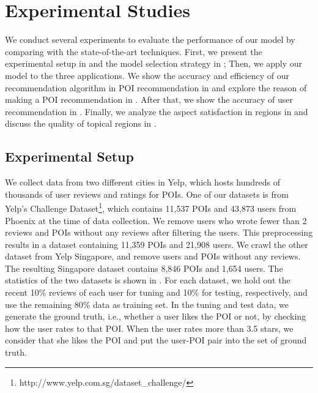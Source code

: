 \section{Experimental Studies}
\label{sec:eval}
We conduct several experiments to evaluate the performance of our
model by comparing with the state-of-the-art techniques.
First, we present the experimental setup in  and
the model selection strategy in ;
Then, we apply our model to the three applications.
We show the accuracy and efficiency of
our recommendation algorithm in POI recommendation in 
and explore the reason of making a POI recommendation
in .
After that, we show the accuracy of user recommendation
in .
Finally, we analyze the aspect satisfaction in regions in 
and discuss the quality of topical
regions in .

\subsection{Experimental Setup}
\label{sec:data}
We collect data from two different cities in Yelp,
which hosts
hundreds of thousands of user reviews and ratings for POIs.
One of our datasets is from Yelp's Challenge
Dataset\footnote{http://www.yelp.com.sg/dataset\_challenge/}, which
contains 11,537 POIs and 43,873 users from Phoenix at
the time of data collection. We remove users
who wrote fewer than 2 reviews and POIs without any reviews
after filtering the users. This preprocessing results
in a dataset containing 11,359 POIs and 21,908 users.
We crawl the other dataset from Yelp Singapore, and
remove users and POIs without any reviews.
The resulting Singapore dataset
contains 8,846 POIs and 1,654 users.
The statistics of the two
datasets is shown in .
For each dataset, we hold out the recent
10\% reviews of each user for tuning and 10\% for testing, respectively,
and use the remaining 80\% data as training set. In
the tuning and test data, we generate the ground truth,
i.e., whether a user likes the POI or not, by checking
how the user rates to that POI. When the user rates
more than 3.5 stars, we consider that she likes the POI and
put the user-POI pair into the set of ground truth.

